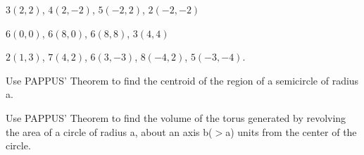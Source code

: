 \documentclass[11pt]{amsbook}
\begin{document}

	\begin{hEnumerateAlpha}
		\item $3(2, 2)$, $4(2, -2)$, $5(-2, 2)$, $2(-2, -2)$

		\item $6(0, 0)$, $6(8, 0)$, $6(8, 8)$, $3(4, 4)$

		\item $2(1, 3)$, $7(4, 2)$, $6(3, -3)$, $8(-4, 2)$, $5(-3, -4)$.
		
 
	\end{hEnumerateAlpha}	
    
   	 \begin{hEnumerateArabic}
 		 \setcounter{enumi}{58}
  		 \item Use PAPPUS' Theorem to  find the centroid of the region of a semicircle 
         	 of radius a.
         	 \item Use PAPPUS' Theorem to find the volume of the torus generated by 
        	 revolving the area of a circle of radius a, about an axis b($>$a) units 
         	 from the center of the circle. \\
	\end{hEnumerateArabic}
    
\end{document}
